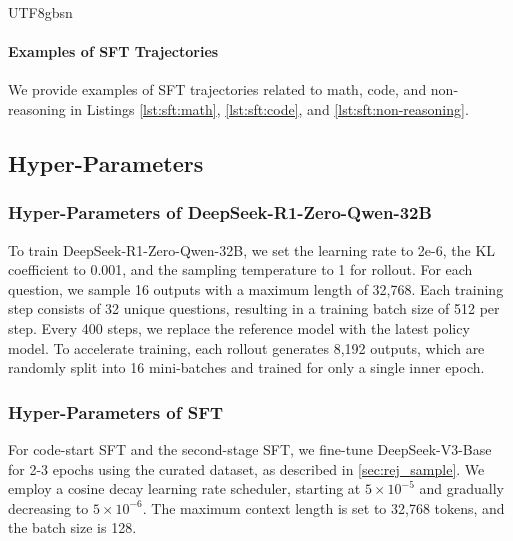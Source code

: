 \documentclass[11pt, a4paper, logo, copyright, nonumbering]{deepseek}
\newcommand{\dsro}{DeepSeek-R1-Zero}
\begin{document}
\begin{CJK*}{UTF8}{gbsn}
\paragraph{Examples of SFT Trajectories}
\label{sec:sft-example}

We provide examples of SFT trajectories related to math, code, and non-reasoning in Listings \ref{lst:sft:math}, \ref{lst:sft:code}, and \ref{lst:sft:non-reasoning}.







\subsection{Hyper-Parameters}

\subsubsection{Hyper-Parameters of \dsro{}-Qwen-32B } \label{sec: qwen-zero}
To train \dsro{}-Qwen-32B, we set the learning rate to 2e-6, the KL coefficient to 0.001, and the sampling temperature to 1 for rollout. For each question, we sample 16 outputs with a maximum length of 32,768. Each training step consists of 32 unique questions, resulting in a training batch size of 512 per step. Every 400 steps, we replace the reference model with the latest policy model. To accelerate training, each rollout generates 8,192 outputs, which are randomly split into 16 mini-batches and trained for only a single inner epoch.

\subsubsection{Hyper-Parameters of SFT} \label{sec: r1-1-sft}

For code-start SFT and the second-stage SFT,
we fine-tune DeepSeek-V3-Base for 2-3 epochs using the curated dataset, as described in \ref{sec:rej_sample}.
We employ a cosine decay learning rate scheduler, starting at \(5 \times 10^{-5}\) and gradually decreasing to \(5 \times 10^{-6}\). The maximum context length is set to 32,768 tokens, and the batch size is 128.


\end{CJK*}
\end{document}
